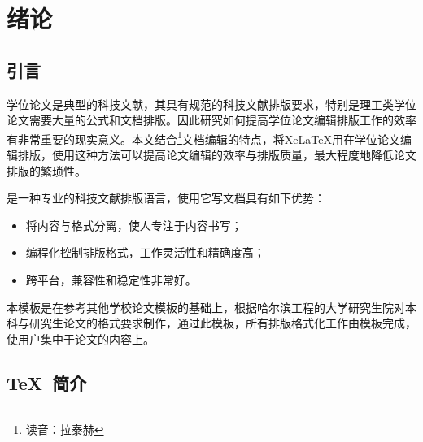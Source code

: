 
%
%
%


\chapter{绪论}
\label{chap01}

\section{引言}

学位论文是典型的科技文献，其具有规范的科技文献排版要求，特别是理工类学位论文需要大量的公式和文档排版。因此研究如何提高学位论文编辑排版工作的效率有非常重要的现实意义。本文结合\XeLaTeX{}\footnote{读音：拉泰赫}文档编辑的特点，将Xe\LaTeX{}用在学位论文编辑排版，使用这种方法可以提高论文编辑的效率与排版质量，最大程度地降低论文排版的繁琐性。

\XeLaTeX{}是一种专业的科技文献排版语言，使用它写文档具有如下优势：
\begin{itemize}
  \item 将内容与格式分离，使人专注于内容书写；
  \item 编程化控制排版格式，工作灵活性和精确度高；
  \item 跨平台，兼容性和稳定性非常好。
\end{itemize}

本模板是在参考其他学校论文模板的基础上，根据哈尔滨工程的大学研究生院对本科与研究生论文的格式要求制作，通过此模板，所有排版格式化工作由模板完成，使用户集中于论文的内容上。

\section{TeX~简介}

